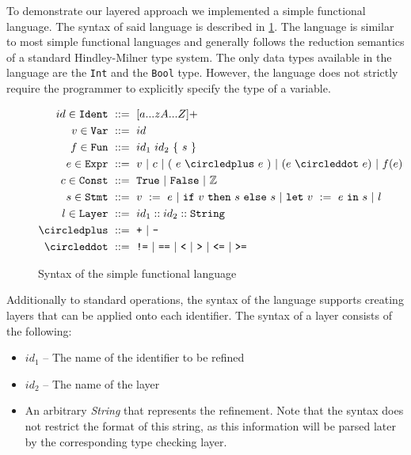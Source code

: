 \documentclass[acmsmall, review, screen]{acmart}
\begin{document}
To demonstrate our layered approach we implemented a simple functional language. The syntax of said language is described in \ref{fig:lang}. The language is similar to most simple functional languages and generally follows the reduction semantics of a standard Hindley-Milner type system. The only data types available in the language are the \texttt{Int} and the \texttt{Bool} type. However, the language does not strictly require the programmer to explicitly specify the type of a variable.

\begin{figure}[ht!]
\begin{align*}
	id \in \texttt{Ident}\ 	&::=\ [a...zA...Z]+ \\
	v \in \texttt{Var}\ 	&::=\ id \\
	f \in \texttt{Fun}\ 	&::=\ id_1\ id_2\ \{\ s\ \}\\
	e \in \texttt{Expr}\ 	&::=\ v\ |\ c\ |\ (\ e\ \circledplus\ e\ )\ |\ (e\ \circleddot\ e)\ |\ f(e) \\
	c \in \texttt{Const}\ 	&::=\ \texttt{True}\ |\ \texttt{False}\ |\ \mathbb{Z} \\
	s \in \texttt{Stmt}\ 	&::=\ v\ :=\ e\ |\ \texttt{if}\ v\ \texttt{then}\ s\ \texttt{else}\ s\ |\ \texttt{let}\ v\ :=\ e\ \texttt{in}\ s\ |\ l \\
	l \in \texttt{Layer}\ 	&::=\ id_1::id_2::\texttt{String} \\
	\circledplus\ 		&::=\ \texttt{+}\ |\ \texttt{-} \\
	\circleddot\ 		&::=\ \texttt{!=}\ |\ \texttt{==}\ |\ \texttt{<} \ |\ \texttt{>} \ |\ \texttt{<=} \ |\ \texttt{>=} \\
\end{align*}
\caption{Syntax of the simple functional language}
\label{fig:lang}
\end{figure}

Additionally to standard operations, the syntax of the language supports creating layers that can be applied onto each identifier. The syntax of a layer consists of the following:
\begin{itemize}
	\item $id_1$ -- The name of the identifier to be refined
	\item $id_2$ -- The name of the layer
	\item An arbitrary \textit{String} that represents the refinement. Note that the syntax does not restrict the format of this string, as this information will be parsed later by the corresponding type checking layer.
\end{itemize}
\end{document}
